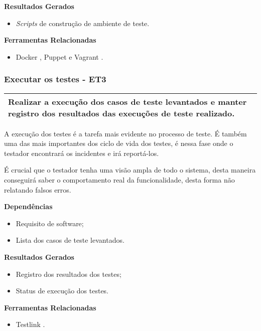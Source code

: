 \textbf{Resultados Gerados}
\begin{itemize}
    \item \textit{Scripts} de construção de ambiente de teste.
\end{itemize}

\textbf{Ferramentas Relacionadas}
\begin{itemize}
    \item Docker \cite{Docker}, Puppet \cite{Puppet} e Vagrant \cite{Vagrant}.
\end{itemize}


\subsubsection{Executar os testes - ET3}
\label{sec:et3}

\begin{table}[H]
\centering
\begin{tabular}{|p{130mm}|}
\hline
Realizar a execução dos casos de teste levantados e manter registro dos resultados das execuções de teste realizado. \\ 
\hline
\end{tabular}
\end{table}

A execução dos testes é a tarefa mais evidente no processo de teste. É também uma das mais importantes dos ciclo de vida dos testes, é nessa fase onde o testador encontrará os incidentes e irá reportá-los.

É crucial que o testador tenha uma visão ampla de todo o sistema, desta maneira conseguirá saber o comportamento real da funcionalidade, desta forma não relatando falsos erros.

\textbf{Dependências}
\begin{itemize}
    \item Requisito de software;
    \item Lista dos casos de teste levantados.
\end{itemize}

\textbf{Resultados Gerados}
\begin{itemize}
    \item Registro dos resultados dos testes;
    \item Status de execução dos testes.
\end{itemize}

\textbf{Ferramentas Relacionadas}
\begin{itemize}
    \item Testlink \cite{TestLink}.
\end{itemize}


